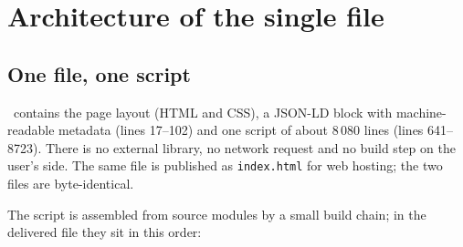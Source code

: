 \chapter{Architecture of the single file}\label{ch:arch}

\section{One file, one script}
\page\ contains the page layout (HTML and CSS), a JSON-LD block with machine-readable metadata (lines 17--102) and one
script of about 8\,080 lines (lines 641--8723). There is no external library, no network request and no build step on the user's
side. The same file is published as \texttt{index.html} for web hosting; the two files are byte-identical.

The script is assembled from source modules by a small build chain; in the delivered file they sit in this order:

